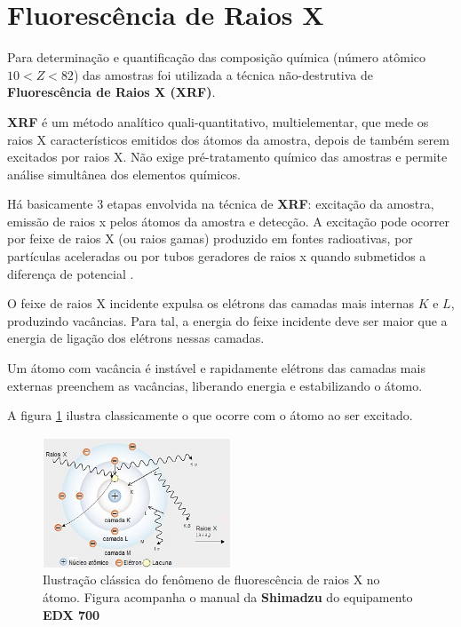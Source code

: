 \section{Fluorescência de Raios X}

Para determinação e quantificação das composição química (número atômico 
$ 10 < Z < 82$) das amostras foi utilizada a técnica não-destrutiva de 
\textbf{Fluorescência de Raios X (XRF)}.

\textbf{XRF} é um método analítico quali-quantitativo, 
multielementar, que mede os raios X característicos emitidos dos átomos da amostra, 
depois de também serem excitados por raios X. Não exige pré-tratamento químico
das amostras e permite análise simultânea dos elementos químicos.

Há basicamente 3 etapas envolvida na técnica de \textbf{XRF}:
excitação da amostra, emissão de raios x pelos átomos da amostra
e detecção. A excitação pode ocorrer por feixe de raios X (ou raios gamas) 
produzido em fontes radioativas, por partículas aceleradas ou 
por tubos geradores de raios x quando submetidos a diferença de potencial
\citep{jenkins1988}. 

O feixe de raios X incidente expulsa os elétrons das camadas mais 
internas $K$ e $L$, produzindo vacâncias. Para tal, a energia do feixe
incidente deve ser maior que a energia de ligação dos elétrons nessas camadas. 

Um átomo com vacância é instável e rapidamente elétrons das camadas 
mais externas preenchem as vacâncias, liberando energia e estabilizando o átomo.  

A figura \ref{fig:shimadzu_atomo} ilustra classicamente o que ocorre com
o átomo ao ser excitado.

\begin{figure}[H]
\begin{center} 
  \includegraphics[width=0.5\textwidth]{../inputs/images/shimadzu_atomo.jpg}
  \caption{Ilustração clássica do fenômeno de fluorescência de raios X no átomo. 
           Figura acompanha o manual da \textbf{Shimadzu} do equipamento 
           \textbf{EDX 700} \label{fig:shimadzu_atomo}}
\end{center}
\end{figure}

